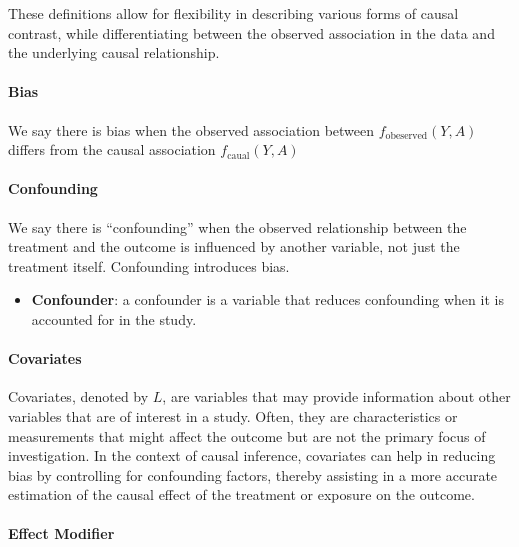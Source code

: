 \documentclass[
  singlecolumn]{article}
\let\oldparagraph\paragraph
\renewcommand{\paragraph}[1]{\oldparagraph{#1}\mbox{}}
\providecommand{\tightlist}{%
  \setlength{\itemsep}{0pt}\setlength{\parskip}{0pt}}\usepackage{longtable,booktabs,array}
\begin{document}
These definitions allow for flexibility in describing various forms of
causal contrast, while differentiating between the observed association
in the data and the underlying causal relationship.

\hypertarget{bias-1}{%
\paragraph{\texorpdfstring{\textbf{Bias}}{Bias}}\label{bias-1}}

We say there is bias when the observed association between
\(f_{\text{obeserved}}(Y,A)\) differs from the causal association
\(f_{\text{caual}}(Y,A)\)

\hypertarget{confounding}{%
\paragraph{\texorpdfstring{\textbf{Confounding}}{Confounding}}\label{confounding}}

We say there is ``confounding'' when the observed relationship between
the treatment and the outcome is influenced by another variable, not
just the treatment itself. Confounding introduces bias.

\begin{itemize}
\tightlist
\item
  \textbf{Confounder}: a confounder is a variable that reduces
  confounding when it is accounted for in the study.
\end{itemize}

\hypertarget{covariates}{%
\paragraph{\texorpdfstring{\textbf{Covariates}}{Covariates}}\label{covariates}}

Covariates, denoted by \(L\), are variables that may provide information
about other variables that are of interest in a study. Often, they are
characteristics or measurements that might affect the outcome but are
not the primary focus of investigation. In the context of causal
inference, covariates can help in reducing bias by controlling for
confounding factors, thereby assisting in a more accurate estimation of
the causal effect of the treatment or exposure on the outcome.

\hypertarget{effect-modifier}{%
\paragraph{\texorpdfstring{\textbf{Effect
Modifier}}{Effect Modifier}}\label{effect-modifier}}
\end{document}
